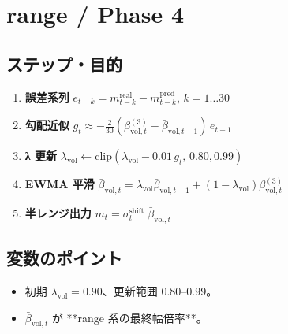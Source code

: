 
\section*{range / Phase 4}\nopagebreak[4]
\subsection*{ステップ・目的}
\begin{flushleft}
\begin{enumerate}
  \item \textbf{誤差系列} \(e_{t-k}=m_{t-k}^{\text{real}}-m_{t-k}^{\text{pred}}\), \(k=1\ldots30\)
  \item \textbf{勾配近似} \(g_t\approx-\frac{2}{30}(\beta_{\text{vol},t}^{(3)}
        -\bar\beta_{\text{vol},t-1})\,e_{t-1}\)
  \item \textbf{λ 更新} \(
        \lambda_{\text{vol}}\leftarrow\text{clip}(
        \lambda_{\text{vol}}-0.01\,g_t,\,0.80,0.99)
        \)
  \item \textbf{EWMA 平滑} \(
        \bar\beta_{\text{vol},t}
        =\lambda_{\text{vol}}\bar\beta_{\text{vol},t-1}
        +(1-\lambda_{\text{vol}})\beta_{\text{vol},t}^{(3)}
        \)
  \item \textbf{半レンジ出力} \(m_t=\sigma_t^{\text{shift}}\;\bar\beta_{\text{vol},t}\)
\end{enumerate}
\end{flushleft}

\subsection*{変数のポイント}
\begin{flushleft}
\begin{itemize}
  \item 初期 \(\lambda_{\text{vol}}=0.90\)、更新範囲 0.80–0.99。  
  \item \(\bar\beta_{\text{vol},t}\) が **range 系の最終幅倍率**。
\end{itemize}
\end{flushleft}

